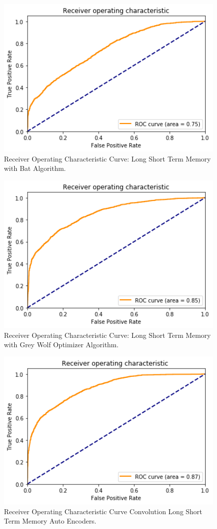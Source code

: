 \documentclass[12pt,a4paper]{article}
\begin{document}
\begin{figure}[H]
    \centerline{\includegraphics[width=4.5in]{lstm-batalgorithm3.png}}
    \caption{Receiver Operating Characteristic Curve: Long Short Term Memory with Bat Algorithm.}
\end{figure}

\begin{figure}[H]
    \centerline{\includegraphics[width=4.5in]{blstm4.png}}
    \caption{Receiver Operating Characteristic Curve: Long Short Term Memory with Grey Wolf Optimizer Algorithm.}
\end{figure}

\begin{figure}[H]
    \centerline{\includegraphics[width=4.5in]{clstm_autoencoder_de4.png}}
    \caption{Receiver Operating Characteristic Curve Convolution Long Short Term Memory Auto Encoders.}
\end{figure}
\end{document}
